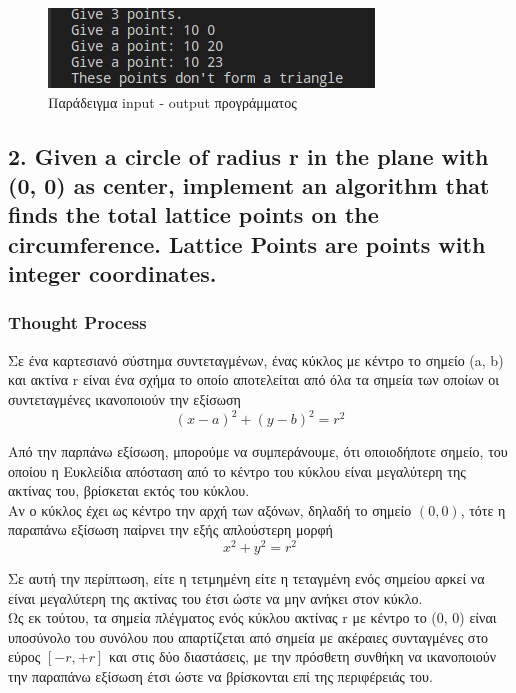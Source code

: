\documentclass[12pt]{article}
\newenvironment{matlab}
	{\begin{figure}[H]\centering\captionsetup{justification=centering}}
	{\end{figure}}
\begin{document}
\begin{matlab}
	\includegraphics[scale=0.7]{images/exercise1_4.png}
	\caption{Παράδειγμα input - output προγράμματος}
\end{matlab}

\pagebreak

\subsection*{2. Given a circle of radius r in the plane with (0, 0) as center, implement an
algorithm that finds the total lattice points on the circumference. Lattice Points are points
with integer coordinates.}

\subsubsection*{Thought Process}

Σε ένα καρτεσιανό σύστημα συντεταγμένων, ένας κύκλος με κέντρο το σημείο (a, b)
και ακτίνα r είναι ένα σχήμα το οποίο αποτελείται από όλα τα σημεία των οποίων
οι συντεταγμένες ικανοποιούν την εξίσωση \\

\[ (x - a) ^ 2 + (y - b) ^ 2 = r ^ 2 \]

Από την παρπάνω εξίσωση, μπορούμε να συμπεράνουμε,
ότι οποιοδήποτε σημείο, του οποίου η Ευκλείδια απόσταση από το κέντρο του κύκλου
είναι μεγαλύτερη της ακτίνας του, βρίσκεται εκτός του κύκλου. \\

Αν ο κύκλος έχει ως κέντρο την αρχή των αξόνων, δηλαδή το σημείο \( (0, 0) \), τότε
η παραπάνω εξίσωση παίρνει την εξής απλούστερη μορφή \\

\[ x ^ 2 + y ^ 2 = r ^ 2 \]

Σε αυτή την περίπτωση, είτε η τετμημένη είτε η τεταγμένη ενός σημείου
αρκεί να είναι μεγαλύτερη της ακτίνας του έτσι ώστε να μην ανήκει στον κύκλο. \\

Ως εκ τούτου, τα σημεία πλέγματος ενός κύκλου ακτίνας r με κέντρο το (0, 0)
είναι υποσύνολο του συνόλου που απαρτίζεται από σημεία με ακέραιες συνταγμένες
στο εύρος \( [-r, +r] \) και στις δύο διαστάσεις, με την πρόσθετη συνθήκη
να ικανοποιούν την παραπάνω εξίσωση έτσι ώστε να βρίσκονται επί της
περιφέρειάς του. \\
\end{document}
